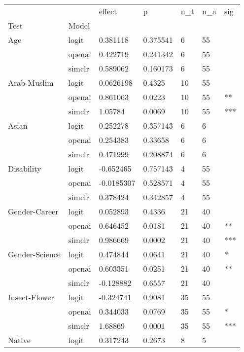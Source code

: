 \begin{tabular}{lllllll}
\toprule
       &        &     effect &           p & n\_t & n\_a &  sig \\
Test & Model &            &             &     &     &      \\
\midrule
Age & logit &   0.381118 &    0.375541 &   6 &  55 &      \\
       & openai &   0.422719 &    0.241342 &   6 &  55 &      \\
       & simclr &   0.589062 &    0.160173 &   6 &  55 &      \\
Arab-Muslim & logit &  0.0626198 &      0.4325 &  10 &  55 &      \\
       & openai &   0.861063 &      0.0223 &  10 &  55 &   ** \\
       & simclr &    1.05784 &      0.0069 &  10 &  55 &  *** \\
Asian & logit &   0.252278 &    0.357143 &   6 &   6 &      \\
       & openai &   0.254383 &     0.33658 &   6 &   6 &      \\
       & simclr &   0.471999 &    0.208874 &   6 &   6 &      \\
Disability & logit &  -0.652465 &    0.757143 &   4 &  55 &      \\
       & openai & -0.0185307 &    0.528571 &   4 &  55 &      \\
       & simclr &   0.378424 &    0.342857 &   4 &  55 &      \\
Gender-Career & logit &   0.052893 &      0.4336 &  21 &  40 &      \\
       & openai &   0.646452 &      0.0181 &  21 &  40 &   ** \\
       & simclr &   0.986669 &      0.0002 &  21 &  40 &  *** \\
Gender-Science & logit &   0.474844 &      0.0641 &  21 &  40 &    * \\
       & openai &   0.603351 &      0.0251 &  21 &  40 &   ** \\
       & simclr &  -0.128882 &      0.6557 &  21 &  40 &      \\
Insect-Flower & logit &  -0.324741 &      0.9081 &  35 &  55 &      \\
       & openai &   0.344033 &      0.0769 &  35 &  55 &    * \\
       & simclr &    1.68869 &      0.0001 &  35 &  55 &  *** \\
Native & logit &   0.317243 &      0.2673 &   8 &   5 &      \\

\end{tabular}
